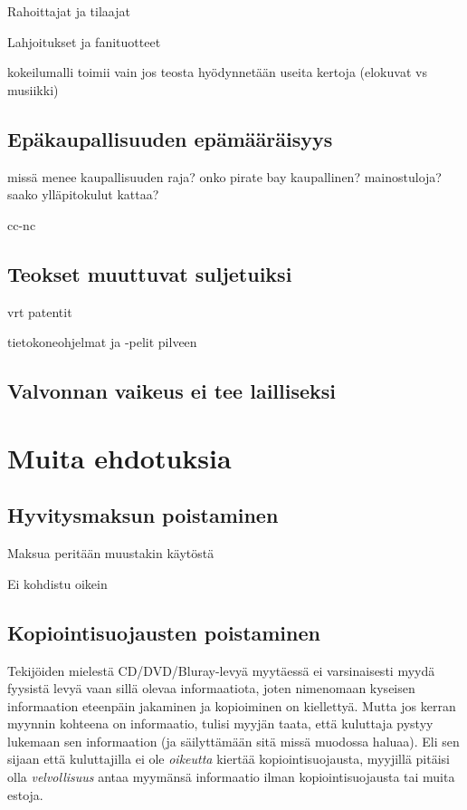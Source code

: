 \documentclass[titlepage,12pt]{article}
\begin{document}
Rahoittajat ja tilaajat

Lahjoitukset ja fanituotteet


kokeilumalli toimii vain jos teosta hyödynnetään useita kertoja
(elokuvat vs musiikki)

\subsection{Epäkaupallisuuden epämääräisyys}

missä menee kaupallisuuden raja? onko pirate bay kaupallinen?
mainostuloja? saako ylläpitokulut kattaa?


cc-nc

\subsection{Teokset muuttuvat suljetuiksi}

vrt patentit

tietokoneohjelmat ja -pelit pilveen

\subsection{Valvonnan vaikeus ei tee lailliseksi}

\section{Muita ehdotuksia}

\subsection{Hyvitysmaksun poistaminen}

Maksua peritään muustakin käytöstä

Ei kohdistu oikein

\subsection{Kopiointisuojausten poistaminen}

Tekijöiden mielestä CD/DVD/Bluray-levyä myytäessä ei varsinaisesti
myydä fyysistä levyä vaan sillä olevaa informaatiota, joten nimenomaan
kyseisen informaation eteenpäin jakaminen ja kopioiminen on
kiellettyä.  Mutta jos kerran myynnin kohteena on informaatio, tulisi
myyjän taata, että kuluttaja pystyy lukemaan sen informaation (ja
säilyttämään sitä missä muodossa haluaa).  Eli sen sijaan että
kuluttajilla ei ole \emph{oikeutta} kiertää kopiointisuojausta,
myyjillä pitäisi olla \emph{velvollisuus} antaa myymänsä informaatio
ilman kopiointisuojausta tai muita estoja.
\end{document}
